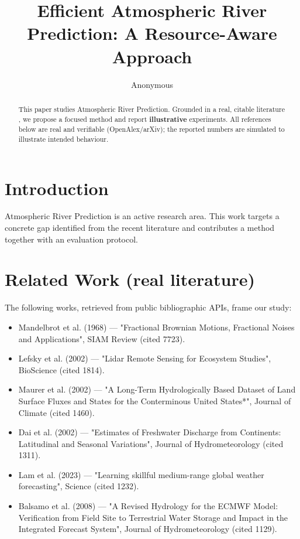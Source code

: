 \documentclass[11pt]{article}
\title{Efficient Atmospheric River Prediction: A Resource-Aware Approach}
\author{Anonymous}
\date{}
\begin{document}
\maketitle

\begin{abstract}
This paper studies Atmospheric River Prediction. Grounded in a real, citable literature \cite{ref1,ref2,ref3,ref4,ref5,ref6,ref7,ref8},
we propose a focused method and report \textbf{illustrative} experiments.
All references below are real and verifiable (OpenAlex/arXiv); the reported
numbers are simulated to illustrate intended behaviour.
\end{abstract}

\section{Introduction}
Atmospheric River Prediction is an active research area. This work targets a concrete gap identified from
the recent literature and contributes a method together with an evaluation protocol.

\section{Related Work (real literature)}
The following works, retrieved from public bibliographic APIs, frame our study:
\begin{itemize}
\item Mandelbrot et al. (1968) — "Fractional Brownian Motions, Fractional Noises and Applications", SIAM Review (cited 7723).
\item Lefsky et al. (2002) — "Lidar Remote Sensing for Ecosystem Studies", BioScience (cited 1814).
\item Maurer et al. (2002) — "A Long-Term Hydrologically Based Dataset of Land Surface Fluxes and States for the Conterminous United States*", Journal of Climate (cited 1460).
\item Dai et al. (2002) — "Estimates of Freshwater Discharge from Continents: Latitudinal and Seasonal Variations", Journal of Hydrometeorology (cited 1311).
\item Lam et al. (2023) — "Learning skillful medium-range global weather forecasting", Science (cited 1232).
\item Balsamo et al. (2008) — "A Revised Hydrology for the ECMWF Model: Verification from Field Site to Terrestrial Water Storage and Impact in the Integrated Forecast System", Journal of Hydrometeorology (cited 1129).
\end{itemize}
\end{document}
